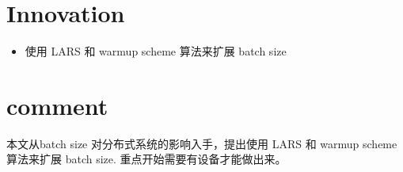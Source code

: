 \documentclass[11pt]{article}
\begin{document}
\section{Innovation}
\label{sec:org422c83f}
\begin{itemize}
\item 使用 LARS 和 warmup scheme 算法来扩展 batch size
\end{itemize}
\section{comment}
\label{sec:org7cc3669}
本文从batch size 对分布式系统的影响入手，提出使用 LARS 和 warmup scheme 算法来扩展 batch size. 重点开始需要有设备才能做出来。
\end{document}
